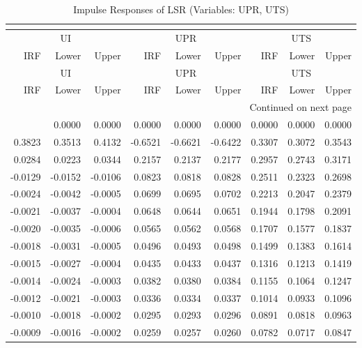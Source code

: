 \begin{longtable}{rrrrrrrrr}
\caption{Impulse Responses of LSR (Variables: UPR, UTS)}\\
\label{tab:lsr_irf_group2}\\
\toprule
\multicolumn{3}{c}{UI} & \multicolumn{3}{c}{UPR} & \multicolumn{3}{c}{UTS} \\
IRF & Lower & Upper & IRF & Lower & Upper & IRF & Lower & Upper \\
\midrule
\endfirsthead
\toprule
\multicolumn{3}{c}{UI} & \multicolumn{3}{c}{UPR} & \multicolumn{3}{c}{UTS} \\
IRF & Lower & Upper & IRF & Lower & Upper & IRF & Lower & Upper \\
\midrule
\endhead
\midrule
\multicolumn{9}{r}{Continued on next page} \\
\midrule
\endfoot
\bottomrule
\endlastfoot
0.0000 & 0.0000 & 0.0000 & 0.0000 & 0.0000 & 0.0000 & 0.0000 & 0.0000 & 0.0000 \\
0.3823 & 0.3513 & 0.4132 & -0.6521 & -0.6621 & -0.6422 & 0.3307 & 0.3072 & 0.3543 \\
0.0284 & 0.0223 & 0.0344 & 0.2157 & 0.2137 & 0.2177 & 0.2957 & 0.2743 & 0.3171 \\
-0.0129 & -0.0152 & -0.0106 & 0.0823 & 0.0818 & 0.0828 & 0.2511 & 0.2323 & 0.2698 \\
-0.0024 & -0.0042 & -0.0005 & 0.0699 & 0.0695 & 0.0702 & 0.2213 & 0.2047 & 0.2379 \\
-0.0021 & -0.0037 & -0.0004 & 0.0648 & 0.0644 & 0.0651 & 0.1944 & 0.1798 & 0.2091 \\
-0.0020 & -0.0035 & -0.0006 & 0.0565 & 0.0562 & 0.0568 & 0.1707 & 0.1577 & 0.1837 \\
-0.0018 & -0.0031 & -0.0005 & 0.0496 & 0.0493 & 0.0498 & 0.1499 & 0.1383 & 0.1614 \\
-0.0015 & -0.0027 & -0.0004 & 0.0435 & 0.0433 & 0.0437 & 0.1316 & 0.1213 & 0.1419 \\
-0.0014 & -0.0024 & -0.0003 & 0.0382 & 0.0380 & 0.0384 & 0.1155 & 0.1064 & 0.1247 \\
-0.0012 & -0.0021 & -0.0003 & 0.0336 & 0.0334 & 0.0337 & 0.1014 & 0.0933 & 0.1096 \\
-0.0010 & -0.0018 & -0.0002 & 0.0295 & 0.0293 & 0.0296 & 0.0891 & 0.0818 & 0.0963 \\
-0.0009 & -0.0016 & -0.0002 & 0.0259 & 0.0257 & 0.0260 & 0.0782 & 0.0717 & 0.0847 \\
\end{longtable}